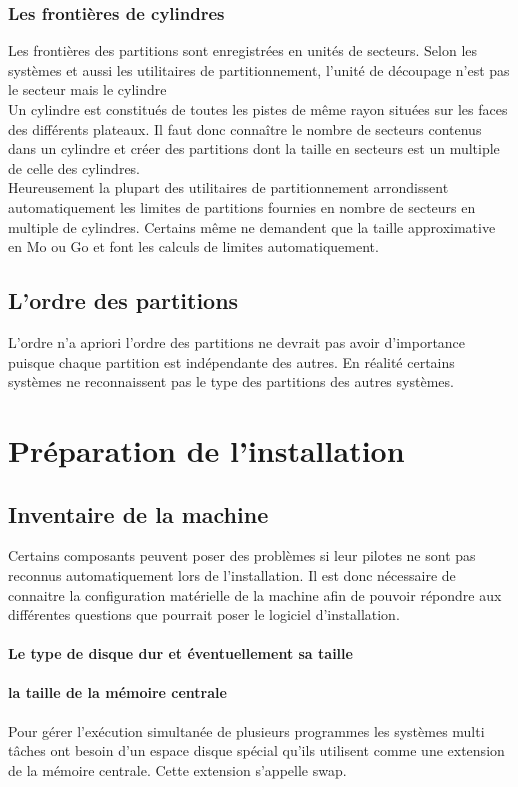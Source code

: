 \documentclass[12pt,a4paper,openany]{book}
\begin{document}
			\subsubsection{Les frontières de cylindres}
				Les frontières des partitions sont enregistrées en unités
				de secteurs. Selon les systèmes et aussi les utilitaires
				de partitionnement, l'unité de découpage n'est pas le secteur mais 
				le cylindre \\
				Un cylindre est constitués de toutes les pistes de même rayon
				situées sur les faces des différents plateaux. Il faut donc
				connaître le nombre de secteurs contenus dans un cylindre et
				créer des partitions dont la taille en secteurs est un multiple
				de celle des cylindres.\\
				Heureusement la plupart des utilitaires de partitionnement arrondissent 
				automatiquement les limites de partitions fournies en nombre de secteurs
				en multiple de cylindres. Certains même ne demandent que la taille 
				approximative en Mo ou Go et font les calculs de limites 
				automatiquement.
		 \subsection{L'ordre des partitions}
			L'ordre n'a apriori l'ordre des partitions ne devrait pas avoir d'importance
			puisque chaque partition est indépendante des autres. En réalité certains
			systèmes ne reconnaissent pas le type des partitions des autres systèmes.
	\section{Préparation de l'installation}
			\subsection{Inventaire de la machine}
			Certains composants peuvent poser des problèmes si leur pilotes ne sont
			pas reconnus automatiquement lors de l'installation. Il est donc 
			nécessaire de connaitre la configuration matérielle de la machine afin
			de pouvoir répondre aux différentes questions que pourrait poser le 
			logiciel d'installation.
			\paragraph{Le type de disque dur et éventuellement sa taille}
			\paragraph{la taille de la mémoire centrale}
				Pour gérer l'exécution simultanée de plusieurs programmes 
				les systèmes multi tâches ont besoin d'un espace disque spécial 
				qu'ils utilisent comme une extension de la mémoire centrale.
				Cette extension s'appelle swap.
\end{document}
